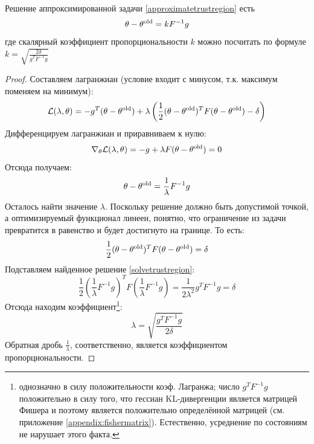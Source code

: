 \begin{theorem}
Решение аппроксимированной задачи \eqref{approximatetrustregion} есть
$$\theta - \theta^{\mathrm{old}} = kF^{-1}g$$
где скалярный коэффициент пропорциональности $k$ можно посчитать по формуле $k = \sqrt{\frac{2 \delta}{g^TF^{-1}g}}$
\begin{proof}
Составляем лагранжиан (условие входит с минусом, т.к. максимум поменяем на минимум):
$$\mathcal{L}(\lambda, \theta) = -g^T(\theta - \theta^{\mathrm{old}}) + \lambda \left( \frac{1}{2} (\theta - \theta^{\mathrm{old}})^T F (\theta - \theta^{\mathrm{old}}) - \delta \right)$$
Дифференцируем лагранжиан и приравниваем к нулю:
$$\nabla_\theta \mathcal{L}(\lambda, \theta) = -g + \lambda F (\theta - \theta^{\mathrm{old}}) = 0$$
Отсюда получаем:
\begin{equation}\label{solvetrustregion}
\theta - \theta^{\mathrm{old}} = \frac{1}{\lambda} F^{-1}g
\end{equation}
Осталось найти значение $\lambda$. Поскольку решение должно быть допустимой точкой, а оптимизируемый функционал линеен, понятно, что ограничение из задачи превратится в равенство и будет достигнуто на границе. То есть:
$$\frac{1}{2} (\theta - \theta^{\mathrm{old}})^T F (\theta - \theta^{\mathrm{old}}) = \delta$$
Подставляем найденное решение \eqref{solvetrustregion}:
$$\frac{1}{2} \left( \frac{1}{\lambda} F^{-1}g \right)^T F \left( \frac{1}{\lambda} F^{-1}g \right) = \frac{1}{2 \lambda^2} g^TF^{-1}g = \delta$$
Отсюда находим коэффициент\footnote{однозначно в силу положительности коэф. Лагранжа; число $g^TF^{-1}g$ положительно в силу того, что гессиан KL-дивергенции является матрицей Фишера и поэтому является положительно определённой матрицей (см. приложение \ref{appendix:fishermatrix}). Естественно, усреднение по состояниям не нарушает этого факта.}:
$$\lambda = \sqrt{\frac{g^TF^{-1}g}{2 \delta}}$$
Обратная дробь $\frac{1}{\lambda}$, соответственно, является коэффициентом пропорциональности.
\end{proof}
\end{theorem}

